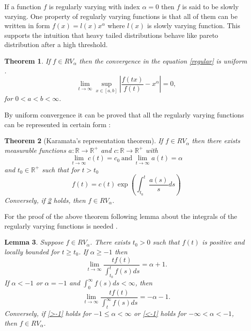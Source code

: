 \documentclass[english,12pt,a4paper,pdftex,sci,utf8]{aaltothesis} %
\newtheorem{theorem}{Theorem}[section]
\newtheorem{lemma}[theorem]{Lemma}
\begin{document}
If a function $f$  is regularly varying with index $\alpha=0$ then $f$ is said to be slowly varying. One property of regularly varying functions is that all of them can be written in form $f(x)=l(x)x^{\alpha}$ where $l(x)$ is slowly varying function. This supports the intuition that heavy tailed distributions behave like pareto distribution after a high threshold. 



\begin{theorem}
If $f \in RV_{\alpha}$ then the convergence in the equation \eqref{regular} is uniform .
\begin{equation*}
\lim_{t \rightarrow \infty} \sup_{x  \in [a,b]} \left| \frac{f(tx)}{f(t)} - x^{\alpha} \right| = 0,
\end{equation*}
for $0<a<b<\infty$.
\label{uniform}
\end{theorem}



By uniform convergence it can be proved that all the regularly varying functions can be represented in certain form \cite{deHaan}:

\begin{theorem}[Karamata's representation theorem]
If $f \in RV_{\alpha}$ then there exists measurable functions $a: \mathbb{R} \rightarrow \mathbb{R^+}$ and $c: \mathbb{R} \rightarrow \mathbb{R^+}$ with
\begin{equation*}
\lim_{t \rightarrow \infty} c(t) = c_0 \  \text{and} \  \lim_{t \rightarrow \infty} a(t) = \alpha
\end{equation*}
and $t_0 \in \mathbb{R^+}$ such that for $t > t_0$
\begin{equation}
f(t) = c(t) \exp \left(\int_{t_0}^{t}  \frac{a(s)}{s} ds \right)
\end{equation}
Conversely, if \ref{karamata} holds, then $f \in RV_{\alpha}$.
\label{karamata}
\end{theorem}

For the proof of the above theorem following lemma about the integrals of the regularly varying functions is needed \cite{deHaan}.

\begin{lemma}
Suppose $f \in RV_{\alpha}$. There exists $t_0 > 0$ such that $f(t)$ is positive and locally bounded for $t \geq t_0$. If $\alpha \geq -1$ then
\begin{equation}
\lim_{t \rightarrow \infty} \frac{tf(t)}{\int_{t_0}^{t}f(s)ds} = \alpha + 1.
\label{>-1}
\end{equation}
If $\alpha<-1$ or $\alpha= -1$ and $\int_{0}^{\infty}f(s)ds<\infty$, then
\begin{equation}
\lim_{t \rightarrow \infty} \frac{tf(t)}{\int_{t}^{\infty} f(s) ds} = -\alpha - 1.
\label{<-1}
\end{equation}
Conversely, if \eqref{>-1} holds for $-1\leq \alpha < \infty$ or \eqref{<-1} holds for $-\infty<\alpha<-1$, then $f \in RV_{\alpha}$.
\label{karamlemma}
\end{lemma}
\end{document}
